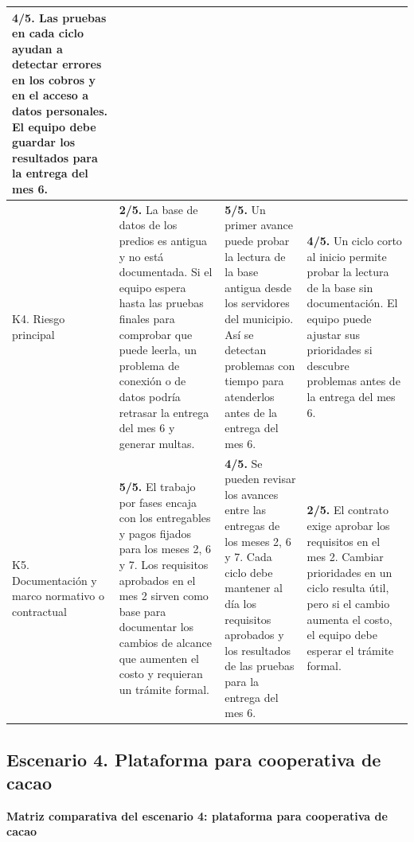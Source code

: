 \documentclass[11pt,a4paper]{article}
\begin{document}
\begin{longtable}{|p{2.6cm}|*{3}{>{\raggedright\arraybackslash}p{\dimexpr(\textwidth-2.6cm-8\tabcolsep-5\arrayrulewidth)/3\relax}|}}
		\textbf{4/5.} Las pruebas en cada ciclo ayudan a detectar errores en
		los cobros y en el acceso a datos personales. El equipo debe guardar
		los resultados para la entrega del mes 6. \\ \hline
		K4. Riesgo principal &
		\textbf{2/5.} La base de datos de los predios es antigua y no está documentada.
		Si el equipo espera hasta las pruebas finales para comprobar que puede leerla,
		un problema de conexión o de datos podría retrasar la entrega del mes 6 y
		generar multas. &
		\textbf{5/5.} Un primer avance puede probar la lectura de la base
		antigua desde los servidores del municipio. Así se detectan problemas
		con tiempo para atenderlos antes de la entrega del mes 6. &
		\textbf{4/5.} Un ciclo corto al inicio permite probar la lectura de
		la base sin documentación. El equipo puede ajustar sus prioridades
		si descubre problemas antes de la entrega del mes 6. \\ \hline
		K5. Documentación y marco normativo o contractual &
		\textbf{5/5.} El trabajo por fases encaja con los entregables y pagos fijados
		para los meses 2, 6 y 7. Los requisitos aprobados en el mes 2 sirven como base
		para documentar los cambios de alcance que aumenten el costo y requieran un
		trámite formal. &
		\textbf{4/5.} Se pueden revisar los avances entre las entregas de los
		meses 2, 6 y 7. Cada ciclo debe mantener al día los requisitos
		aprobados y los resultados de las pruebas para la entrega del mes 6. &
		\textbf{2/5.} El contrato exige aprobar los requisitos en el mes 2.
		Cambiar prioridades en un ciclo resulta útil, pero si el cambio
		aumenta el costo, el equipo debe esperar el trámite formal. \\ \hline
	\end{longtable}
	
	\clearpage
	\subsection{Escenario 4. Plataforma para cooperativa de cacao}
	
	\begin{center}
		\textbf{Matriz comparativa del escenario 4: plataforma para cooperativa de cacao}
	\end{center}
	
\end{document}
